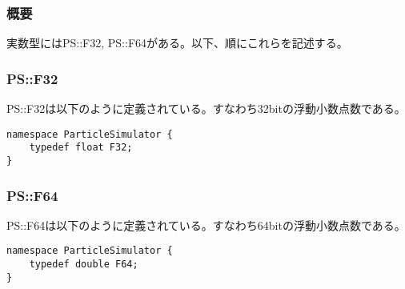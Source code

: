 \subsubsection{概要}

実数型にはPS::F32, PS::F64がある。以下、順にこれらを記述する。

\subsubsection{PS::F32}

PS::F32は以下のように定義されている。すなわち32bitの浮動小数点数である。
\begin{lstlisting}[caption=F32]
namespace ParticleSimulator {
    typedef float F32;
}
\end{lstlisting}

\subsubsection{PS::F64}

PS::F64は以下のように定義されている。すなわち64bitの浮動小数点数である。
\begin{lstlisting}[caption=F64]
namespace ParticleSimulator {
    typedef double F64;
}
\end{lstlisting}
